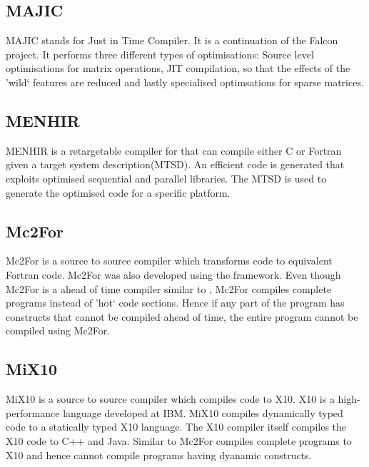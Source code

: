 \subsection{MAJIC}
MAJIC stands for \matlab Just in Time Compiler. It is a continuation of the Falcon project. It performs three different types of optimisations: Source level optimisations for matrix operations, JIT compilation, so that the effects of the 'wild` \matlab features are reduced and lastly specialised optimsations for sparse matrices. 
\subsection{MENHIR}
MENHIR\cite{Chauveau:1999} is a retargetable compiler for \matlab that can compile either C or Fortran given a target system description(MTSD). An efficient code is generated that exploits optimised sequential and parallel libraries. The MTSD is used to generate the optimised code for a specific platform. 
\subsection{Mc2For}
Mc2For\cite{Li:2014} is a source to source compiler which transforms \matlab code to equivalent Fortran code. Mc2For was also developed using the \mclab framework. Even though Mc2For is a ahead of time compiler similar to \velocty, Mc2For compiles complete \matlab programs instead of 'hot` code sections. Hence if any part of the \matlab program has constructs that cannot be compiled ahead of time, the entire program cannot be compiled using Mc2For. 
\subsection{MiX10}
MiX10\cite{vkumar14} is a source to source compiler which compiles \matlab code to X10\cite{x10}. X10 is a high-performance language developed at IBM. MiX10 compiles dynamically typed \matlab code to a statically typed X10 language. The X10 compiler itself compiles the X10 code to C++ and Java. Similar to Mc2For compiles complete \matlab programs to X10 and hence cannot compile \matlab programs having dyanamic constructs.

